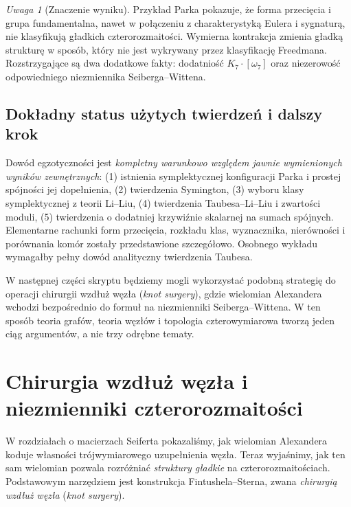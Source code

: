 \documentclass[11pt,a4paper]{report}
\numberwithin{equation}{section}
\theoremstyle{plain}
\theoremstyle{definition}
\theoremstyle{remark}
\newtheorem{uwaga}[twierdzenie]{Uwaga}
\begin{document}
\begin{uwaga}[Znaczenie wyniku]
Przykład Parka pokazuje, że forma przecięcia i grupa
fundamentalna, nawet w połączeniu z charakterystyką Eulera
i sygnaturą, nie klasyfikują gładkich czterorozmaitości.
Wymierna kontrakcja zmienia gładką strukturę w sposób,
który nie jest wykrywany przez klasyfikację Freedmana.
Rozstrzygające są dwa dodatkowe fakty: dodatniość
$K_7\cdot[\omega_7]$ oraz niezerowość odpowiedniego
niezmiennika Seiberga--Wittena.
\end{uwaga}

\section{Dokładny status użytych twierdzeń i dalszy krok}
\label{sec:tg-park14-status}

Dowód egzotyczności jest \emph{kompletny warunkowo względem
jawnie wymienionych wyników zewnętrznych}:
(1) istnienia symplektycznej konfiguracji Parka i prostej
spójności jej dopełnienia, (2) twierdzenia Symington,
(3) wyboru klasy symplektycznej z teorii Li--Liu,
(4) twierdzenia Taubesa--Li--Liu i zwartości moduli,
(5) twierdzenia o dodatniej krzywiźnie skalarnej
na sumach spójnych.
Elementarne rachunki form przecięcia, rozkładu klas,
wyznacznika, nierówności i porównania komór zostały
przedstawione szczegółowo. Osobnego wykładu wymagałby
pełny dowód analityczny twierdzenia Taubesa.

W następnej części skryptu będziemy mogli wykorzystać
podobną strategię do operacji chirurgii wzdłuż węzła
(\emph{knot surgery}), gdzie wielomian Alexandera
wchodzi bezpośrednio do formuł na niezmienniki
Seiberga--Wittena. W ten sposób teoria grafów,
teoria węzłów i topologia czterowymiarowa tworzą
jeden ciąg argumentów, a nie trzy odrębne tematy.


\chapter{Chirurgia wzdłuż węzła i niezmienniki czterorozmaitości}
\label{ch:tg-knot-surgery}

W rozdziałach o macierzach Seiferta pokazaliśmy, jak wielomian
Alexandera koduje własności trójwymiarowego uzupełnienia węzła.
Teraz wyjaśnimy, jak ten sam wielomian pozwala rozróżniać
\emph{struktury gładkie} na czterorozmaitościach. Podstawowym
narzędziem jest konstrukcja Fintushela--Sterna, zwana
\emph{chirurgią wzdłuż węzła} (\emph{knot surgery}).
\end{document}
